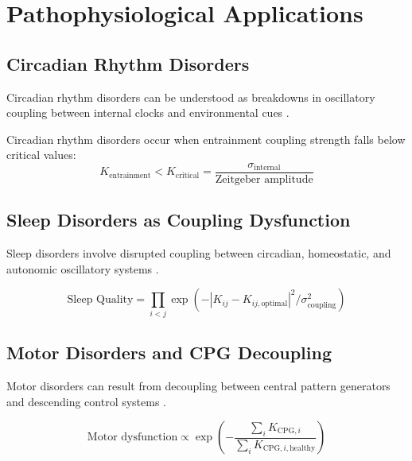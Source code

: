 \documentclass[twocolumn]{article}
\begin{document}
\section{Pathophysiological Applications}

\subsection{Circadian Rhythm Disorders}

Circadian rhythm disorders can be understood as breakdowns in oscillatory coupling between internal clocks and environmental cues \citep{reid2014circadian}.

\begin{theorem}
Circadian rhythm disorders occur when entrainment coupling strength falls below critical values:
\begin{equation}
K_{\text{entrainment}} < K_{\text{critical}} = \frac{\sigma_{\text{internal}}}{\text{Zeitgeber amplitude}}
\label{eq:circadian_threshold}
\end{equation}
\end{theorem}

\subsection{Sleep Disorders as Coupling Dysfunction}

Sleep disorders involve disrupted coupling between circadian, homeostatic, and autonomic oscillatory systems \citep{saper2005sleep}.

\begin{equation}
\text{Sleep Quality} = \prod_{i<j} \exp(-|K_{ij} - K_{ij,\text{optimal}}|^2 / \sigma_{\text{coupling}}^2)
\label{eq:sleep_quality}
\end{equation}

\subsection{Motor Disorders and CPG Decoupling}

Motor disorders can result from decoupling between central pattern generators and descending control systems \citep{brownstone2008spinal}.

\begin{equation}
\text{Motor dysfunction} \propto \exp\left(-\frac{\sum_{i} K_{\text{CPG},i}}{\sum_{i} K_{\text{CPG},i,\text{healthy}}}\right)
\label{eq:motor_dysfunction}
\end{equation}
\end{document}
